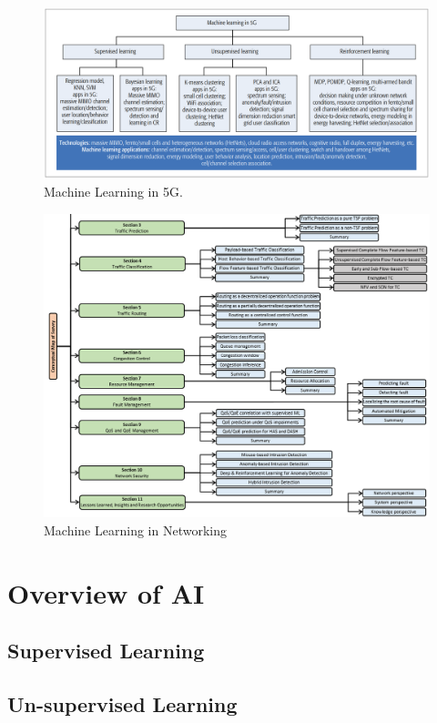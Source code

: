 \documentclass[journal,UTF8]{IEEEtran}
\begin{document}
\begin{figure}
	\centering
	\includegraphics[width=7in]{fig/MLin5G.png}
	\caption{Machine Learning in 5G.}
	\label{fig:MLin5G}
\end{figure}

 \begin{figure}
	\centering
	\includegraphics{fig/MLinN.png}
	\caption{Machine Learning in Networking}
	\label{fig:MLinN}
\end{figure}


\section{Overview of AI}
\subsection{Supervised Learning}

\subsection{Un-supervised Learning}
\end{document}
